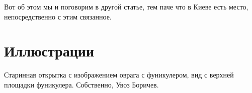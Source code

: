 \documentclass[a5paper,11pt,openany]{article}
\begin{document}
   Вот об этом мы и поговорим в другой статье, тем паче что в Киеве есть место, непосредственно с этим связанное.


\newpage

\section{Иллюстрации}

\vspace*{\fill}

Старинная открытка с изображением оврага с фуникулером, вид с верхней площадки фуникулера. Собственно, Увоз Боричев.

\vspace*{\fill}

\newpage



\newpage




%

\begin{thebibliography}{999}

\end{thebibliography}
\end{document}
